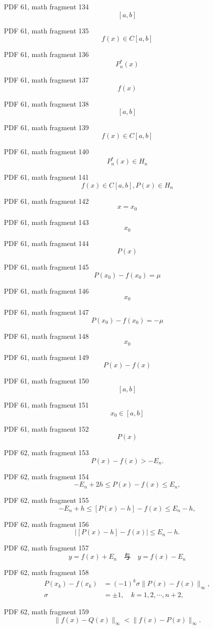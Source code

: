 \documentclass[UTF8,fontset=fandol]{ctexart}
\begin{document}
PDF 61, math fragment 134
\[[a,b]\]
\par
PDF 61, math fragment 135
\[f(x) \in C[a,b]\]
\par
PDF 61, math fragment 136
\[P_n^*(x)\]
\par
PDF 61, math fragment 137
\[f(x)\]
\par
PDF 61, math fragment 138
\[[a,b]\]
\par
PDF 61, math fragment 139
\[f(x) \in C[a,b]\]
\par
PDF 61, math fragment 140
\[P_n^*(x) \in H_n\]
\par
PDF 61, math fragment 141
\[f(x) \in C[a,b], P(x) \in H_n\]
\par
PDF 61, math fragment 142
\[x = x_0\]
\par
PDF 61, math fragment 143
\[x_0\]
\par
PDF 61, math fragment 144
\[P(x)\]
\par
PDF 61, math fragment 145
\[P(x_0) - f(x_0) = \mu\]
\par
PDF 61, math fragment 146
\[x_0\]
\par
PDF 61, math fragment 147
\[P(x_0) - f(x_0) = -\mu\]
\par
PDF 61, math fragment 148
\[x_0\]
\par
PDF 61, math fragment 149
\[P(x) - f(x)\]
\par
PDF 61, math fragment 150
\[[a,b]\]
\par
PDF 61, math fragment 151
\[x_0 \in [a,b]\]
\par
PDF 61, math fragment 152
\[P(x)\]
\par
PDF 62, math fragment 153
\[
P(x) - f(x) > -E_n.
\]
\par
PDF 62, math fragment 154
\[
-E_n + 2h \leqslant P(x) - f(x) \leqslant E_n,
\]
\par
PDF 62, math fragment 155
\[
-E_n + h \leqslant [P(x) - h] - f(x) \leqslant E_n - h,
\]
\par
PDF 62, math fragment 156
\[
|[P(x) - h] - f(x)| \leqslant E_n - h.
\]
\par
PDF 62, math fragment 157
\[
y = f(x) + E_n \quad \text{与} \quad y = f(x) - E_n
\]
\par
PDF 62, math fragment 158
\[
\begin{aligned}
P(x_k)-f(x_k)&=(-1)^k\sigma\|P(x)-f(x)\|_\infty,\\
\sigma&=\pm1,\quad k=1,2,\cdots,n+2,
\end{aligned}
\tag{3.2.4}
\]
\par
PDF 62, math fragment 159
\[
\| f(x) - Q(x) \|_\infty < \| f(x) - P(x) \|_\infty.
\]
\end{document}
